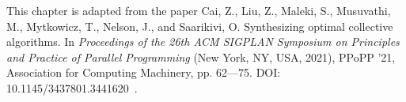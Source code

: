 \newcommand{\broadcasting}{non-com\-bin\-ing\xspace}
\newcommand{\broadcastingCap}{Non-com\-bin\-ing\xspace}
\newcommand{\reducing}{com\-bin\-ing\xspace}
\newcommand{\reducingCap}{Com\-bin\-ing\xspace}

\newcommand{\etal}{\textit{et al}.}

This chapter is adapted from the paper Cai, Z., Liu, Z., Maleki, S., Musuvathi, M., Mytkowicz, T., Nelson, J., and Saarikivi, O.
Synthesizing optimal collective algorithms. In \textit{Proceedings of the 26th ACM SIGPLAN
Symposium on Principles and Practice of Parallel Programming} (New York, NY, USA,
2021), PPoPP ’21, Association for Computing Machinery, pp. 62––75. DOI: 10.1145/3437801.3441620~\cite{sccl}.








